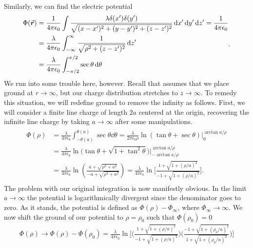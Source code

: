 {Similarly, we can find the electric potential
\begin{eqnarray}
    \begin{aligned}
        \Phi(\va*{r}) &= \frac{1}{4 \pi \epsilon_0} \int \frac{\lambda \delta(x') \delta(y')}{\sqrt{(x - x')^2 + (y - y')^2 + (z - z')^2}} \dd{x'} \dd{y'} \dd{z'} = \frac{1}{4 \pi \epsilon_0} \\
                      &= \frac{\lambda}{4 \pi \epsilon_0} \int_{-\infty}^{\infty} \frac{1}{\sqrt{\rho^2 + (z - z')^2}} \dd{z'} \\
                      &= \frac{\lambda}{4 \pi \epsilon_0} \int_{-\pi/2}^{\pi/2} \sec{\theta} \dd{\theta}
    \end{aligned}
.\end{eqnarray}
We run into some trouble here, however.
Recall that  assumes that we place ground at $r \rightarrow \infty$, but our charge distribution stretches to $z \rightarrow \infty$.
To remedy this situation, we will redefine ground to remove the infinity as follows.
First, we will consider a finite line charge of length $2a$ centered at the origin, recovering the infinite line charge by taking $a \rightarrow \infty$ after some manipulations.
\begin{eqnarray}
    \begin{aligned}
        \Phi(\rho) &= \frac{\lambda}{4 \pi \epsilon_0} \int_{-\theta(a)}^{\theta(a)} \sec{\theta} \dd{\theta} = \frac{\lambda}{2 \pi \epsilon_0 \rho} \ln{(\tan{\theta} + \sec{\theta})} \Big|_{0}^{\arctan{a/\rho}} \\
        &= \frac{\lambda}{4 \pi \epsilon_0} \ln{\Big( \tan{\theta} + \sqrt{1 + \tan^2{\theta}} \Big)} \Big|_{-\arctan{a/\rho}}^{\arctan{a/\rho}} \\
        &= \frac{\lambda}{4 \pi \epsilon_0} \ln( \frac{a + \sqrt{ \rho^2 + a^2 }}{-a + \sqrt{\rho^2 + a^2}} ) = \frac{\lambda}{4 \pi \epsilon_0} \ln\Bigg[ \frac{1 + \sqrt{1 + ( \rho/a )^2}}{-1 + \sqrt{1 + ( \rho/a )^2}} \Bigg]
    .\end{aligned}
\end{eqnarray}
The problem with our original integration is now manifestly obvious.
In the limit $a \rightarrow \infty$ the potential is logarithmically divergent since the denominator goes to zero.
As it stands, the potential is defined as $\Phi(\rho) - \Phi_{\infty}$, where $\Phi_{\infty} \rightarrow \infty$.
We now shift the ground of our potential to $\rho = \rho_0$ such that $\Phi(\rho_0) = 0$
\begin{eqnarray}
    \Phi(\rho) \rightarrow \Phi(\rho) - \Phi(\rho_0) = \frac{\lambda}{4 \pi \epsilon_0} \ln{ \Bigg[ \Bigg( \frac{1 + \sqrt{1 + (\rho/a)^2}}{-1 + \sqrt{1 + (\rho/a)^2}} \Bigg) \Bigg( \frac{-1 + \sqrt{1 + (\rho_0/a)^2}}{1 + \sqrt{1 + (\rho_0/a)^2}} \Bigg) \Bigg] }

\end{eqnarray}}

